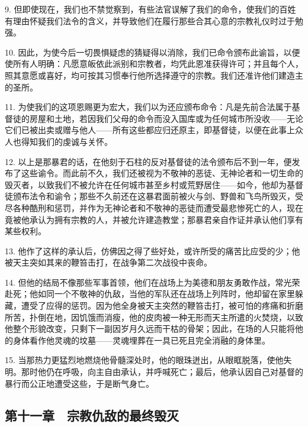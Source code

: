 9. 但即使现在，我们也不禁觉察到，有些法官误解了我们的命令，使我们的百姓有理由怀疑我们法令的含义，并导致他们在履行那些合其心意的宗教礼仪时过于勉强。\par

10. 因此，为使今后一切畏惧疑虑的猜疑得以消除，我们已命令颁布此谕旨，以便使所有人明确：凡愿意皈依此派别和宗教者，均凭此恩准获得许可；并且每个人，照其意愿或喜好，均可按其习惯奉行他所选择遵守的宗教。我们还准许他们建造主的圣所。\par

11. 为使我们的这项恩赐更为宏大，我们以为还应颁布命令：凡是先前合法属于基督徒的房屋和土地，若因我们父母的命令而没入国库或为任何城市所没收——无论它们已被出卖或赠与他人——所有这些都应归还原主，即基督徒，以便在此事上众人也得知我们的虔诚与关怀。\par

12. 以上是那暴君的话，在他刻于石柱的反对基督徒的法令颁布后不到一年，便发布了这些谕令。而此前不久，我们还被视为不敬神的恶徒、无神论者和一切生命的毁灭者，以致我们不被允许在任何城市甚至乡村或荒野居住——如今，他却为基督徒颁布法令和谕令；那些不久前还在这暴君面前被火与剑、野兽和飞鸟所毁灭，受尽各种酷刑和惩罚，并作为无神论者和不敬神的恶徒而遭受最悲惨死亡的人，现在竟被他承认为拥有宗教的人，并被允许建造教堂；那暴君亲自作证并承认他们享有某些权利。\par

13. 他作了这样的承认后，仿佛因之得了些好处，或许所受的痛苦比应受的少；他被天主突如其来的鞭笞击打，在战争第二次战役中丧命。\par

14. 但他的结局不像那些军事首领，他们在战场上为美德和朋友勇敢作战，常光荣赴死；他如同一个不敬神的仇敌，当他的军队还在战场上列阵时，他却留在家里躲藏，遭受了应得的惩罚。因为他全身被天主突然的鞭笞击打，被可怕的疼痛和折磨所苦，扑倒在地，因饥饿而消瘦，他的皮肉被一种无形而天主所遣的火焚烧，以致他整个形貌改变，只剩下一副因岁月久远而干枯的骨架；因此，在场的人只能将他的身体看作他灵魂的坟墓——灵魂埋葬在一具已死且完全消融的身体里。\par

15. 当那热力更猛烈地燃烧他骨髓深处时，他的眼珠迸出，从眼眶脱落，使他失明。那时他仍在呼吸，向主自由承认，并呼喊死亡；最后，他承认因自己对基督的暴行而公正地遭受这些，于是断气身亡。\par


\subsection{第十一章　宗教仇敌的最终毁灭}


